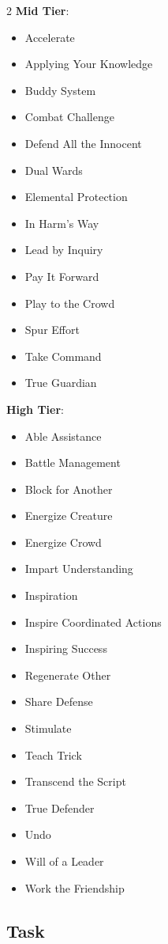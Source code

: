 \begin{multicols}{2}
\textbf{Mid Tier}:

\begin{itemize}
\item Accelerate
\item Applying Your Knowledge
\item Buddy System
\item Combat Challenge
\item Defend All the Innocent
\item Dual Wards
\item Elemental Protection
\item In Harm’s Way
\item Lead by Inquiry
\item Pay It Forward
\item Play to the Crowd
\item Spur Effort
\item Take Command
\item True Guardian
\end{itemize}

\textbf{High Tier}:

\begin{itemize}
\item Able Assistance
\item Battle Management
\item Block for Another
\item Energize Creature
\item Energize Crowd
\item Impart Understanding
\item Inspiration
\item Inspire Coordinated Actions
\item Inspiring Success
\item Regenerate Other
\item Share Defense
\item Stimulate
\item Teach Trick
\item Transcend the Script
\item True Defender
\item Undo
\item Will of a Leader
\item Work the Friendship
\end{itemize}

\subsection{Task}


\end{multicols}
